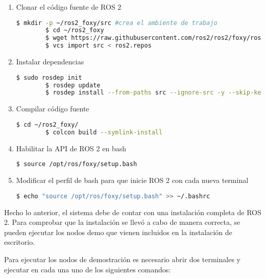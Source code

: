 \begin{enumerate}
    \item Clonar el código fuente de ROS 2

    \begin{lstlisting}[language = bash]
        $ mkdir -p ~/ros2_foxy/src #crea el ambiente de trabajo
        $ cd ~/ros2_foxy
        $ wget https://raw.githubusercontent.com/ros2/ros2/foxy/ros2.repos
        $ vcs import src < ros2.repos
    \end{lstlisting}

    \item Instalar dependencias

    \begin{lstlisting}[language = bash]
        $ sudo rosdep init
        $ rosdep update
        $ rosdep install --from-paths src --ignore-src -y --skip-keys "fastcdr rti-connext-dds-5.3.1 urdfdom_headers"
    \end{lstlisting}

    \item Compilar código fuente
    
    \begin{lstlisting}[language = bash]
        $ cd ~/ros2_foxy/
        $ colcon build --symlink-install
    \end{lstlisting}

    \item Habilitar la API de ROS 2 en bash
    
    \begin{lstlisting}[language = bash]
        $ source /opt/ros/foxy/setup.bash
    \end{lstlisting}

    \item Modificar el perfil de bash para que inicie ROS 2 con cada nueva terminal
    
    \begin{lstlisting}[language = bash]
        $ echo "source /opt/ros/foxy/setup.bash" >> ~/.bashrc 
    \end{lstlisting}

\end{enumerate}

Hecho lo anterior, el sistema debe de contar con una instalación completa de ROS 2. Para comprobar que la instalación se llevó a cabo de manera correcta, se pueden ejecutar los nodos demo que vienen incluidos en la instalación de escritorio.

Para ejecutar los nodos de demostración es necesario abrir dos terminales y ejecutar en cada una uno de los siguientes comandos:

